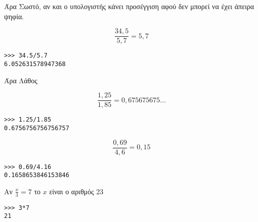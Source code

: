 Άρα Σωστό, αν και ο υπολογιστής κάνει προσέγγιση αφού δεν μπορεί να έχει άπειρα ψηφία.
\begin{exercise}
$$\frac{34,5}{5,7} = 5,7$$
\end{exercise}
\begin{lstlisting}
>>> 34.5/5.7
6.052631578947368
\end{lstlisting}
Άρα Λάθος
\begin{exercise}
$$\frac{1,25}{1,85} = 0,675675675\ldots$$
\end{exercise}
\begin{lstlisting}
>>> 1.25/1.85
0.6756756756756757
\end{lstlisting}
\begin{exercise}
$$\frac{0,69}{4,6}=0,15$$
\end{exercise}
\begin{lstlisting}
>>> 0.69/4.16
0.1658653846153846
\end{lstlisting}
\begin{exercise}
Αν $\frac{x}{3} = 7$ το $x$ είναι ο αριθμός 23
\end{exercise}
\begin{lstlisting}
>>> 3*7
21
\end{lstlisting}
